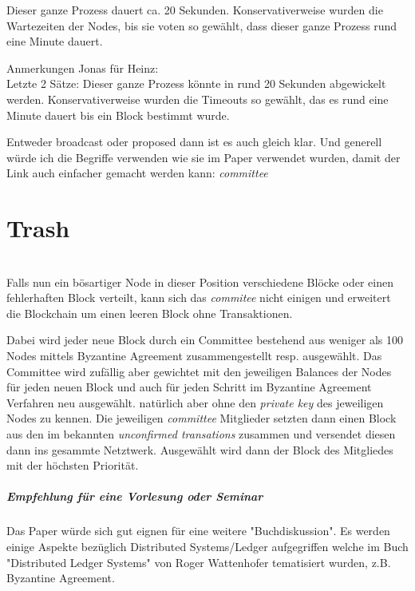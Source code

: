 \documentclass[11pt,a4paper]{article}
\begin{document}
Dieser ganze Prozess dauert ca. 20 Sekunden. Konservativerweise wurden die Wartezeiten der Nodes, bis sie voten so gew\"ahlt, dass dieser ganze Prozess rund eine Minute dauert.

Anmerkungen Jonas f\"ur Heinz:\\
	Letzte 2 S\"atze:
	Dieser ganze Prozess k\"onnte in rund 20 Sekunden abgewickelt werden.
	Konservativerweise wurden die Timeouts so gew\"ahlt, das es rund eine Minute dauert bis ein Block bestimmt wurde.

	Entweder broadcast oder proposed dann ist es auch gleich klar.
	Und generell w\"urde ich die Begriffe verwenden wie sie im Paper verwendet wurden, damit der Link auch einfacher gemacht werden kann:
		\textit{committee}

\newpage

\chapter{\textbf{\Large Trash}}\\
Falls nun ein b\"osartiger Node in dieser Position verschiedene Bl\"ocke oder einen fehlerhaften Block
verteilt, kann sich das \textit{commitee} nicht einigen und erweitert die Blockchain um einen leeren Block ohne Transaktionen.

Dabei wird jeder neue Block durch ein Committee bestehend aus weniger als 100 Nodes mittels Byzantine Agreement zusammengestellt resp. ausgew\"ahlt.
Das Committee wird zuf\"allig aber gewichtet mit den jeweiligen Balances der Nodes f\"ur jeden neuen Block und auch f\"ur jeden Schritt im Byzantine Agreement Verfahren neu ausgew\"ahlt.
nat\"urlich aber ohne den \textit{private key} des jeweiligen Nodes zu kennen.
Die jeweiligen \textit{committee} Mitglieder setzten dann einen Block aus den im bekannten \textit{unconfirmed transations} zusammen und versendet diesen dann ins gesammte Netztwerk.
Ausgew\"ahlt wird dann der Block des Mitgliedes mit der h\"ochsten Priorit\"at.



\paragraph*{Empfehlung f\"ur eine Vorlesung oder Seminar}
Das Paper \cite{Gilad:2017:ASB:3132747.3132757} w\"urde sich gut eignen f\"ur eine weitere "Buchdiskussion".
Es werden einige Aspekte bez\"uglich Distributed Systems/Ledger aufgegriffen welche
im Buch "Distributed Ledger Systems" von Roger Wattenhofer tematisiert wurden, z.B. Byzantine Agreement.

\cite{Gilad:2017:ASB:3132747.3132757}
\cite{Chen:2017}



% 
{}
\end{document}
